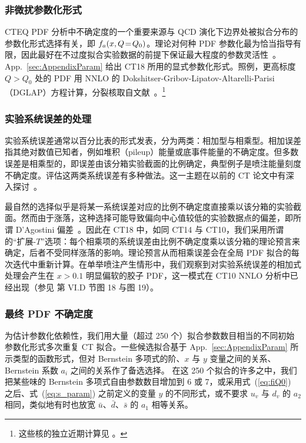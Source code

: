 \subsubsection{非微扰参数化形式\label{sec:ParamForms}}
CTEQ PDF 分析中不确定度的一个重要来源与 QCD 演化下边界处被拟合分布的参数化形式选择有关，即 $f_a(x,Q\! =\! Q_0)$。理论对何种 PDF 参数化最为恰当指导有限，因此最好在不过度拟合实验数据的前提下保证最大程度的参数灵活性~\cite{Kovarik:2019xvh}。App.~\ref{sec:AppendixParam} 给出 CT18 所用的显式参数化形式。照例，更高标度 $Q>Q_0$ 处的 PDF 用 NNLO 的 Dokshitser-Gribov-Lipatov-Altarelli-Parisi（DGLAP）方程计算，分裂核取自文献~\cite{Moch:2004pa,Vogt:2004mw}。\footnote{这些核的独立近期计算见 \cite{Ablinger:2014nga,Ablinger:2017tan}。}

\subsubsection{实验系统误差的处理\label{sec:SystErrors}} 实验系统误差通常以百分比表的形式发表，分为两类：相加型与相乘型。相加误差指其绝对数值已知者，例如堆积（pileup）能量或底事件能量的不确定度。但多数误差是相乘型的，即误差由该分箱实验截面的比例确定，典型例子是喷注能量刻度不确定度。评估这两类系统误差有多种做法。这一主题在以前的 CT 论文中有深入探讨~\cite{Stump:2003yu,Nadolsky:2008zw,Lai:2010vv,Ball:2012wy,Gao:2013xoa,Dulat:2015mca,Hou:2016nqm}。

最自然的选择似乎是将某一系统误差对应的比例不确定度直接乘以该分箱的实验截面。然而由于涨落，这种选择可能导致偏向中心值较低的实验数据点的偏差，即所谓 D'Agostini 偏差~\cite{DAgostini:1993arp,DAgostini:1999gfj}。因此在 CT18 中，如同 CT14 与 CT10，我们采用所谓的``扩展-$T$''选项：每个相乘项的系统误差由比例不确定度乘以该分箱的理论预言来确定，后者不受同样涨落的影响。理论预言从而相乘误差会在全局 PDF 拟合的每次迭代中重新计算。在单举喷注产生情形中，我们观察到对实验系统误差的相加式处理会产生在 $x>0.1$ 明显偏软的胶子 PDF，这一模式在 CT10 NNLO 分析中已经出现（参见 \cite{Gao:2013xoa} 第 VI.D 节图 18 与图 19）。


\subsubsection{最终 PDF 不确定度\label{sec:FinalPDFuncertainty}}
为估计参数化依赖性，我们用大量（超过 250 个）拟合参数数目相当的不同初始参数化形式多次重复 CT 拟合。一些候选拟合基于 App.~\ref{sec:AppendixParam} 所示类型的函数形式，但对 Bernstein 多项式的阶、$x$ 与 $y$ 变量之间的关系、Bernstein 系数 $a_i$ 之间的关系作了备选选择。
在这 250 个拟合的许多之中，我们把某些味的 Bernstein 多项式自由参数数目增加到 6 或 7，或采用式~(\ref{eq:fiQ0}) 之后、式~(\ref{eq:s_param}) 之前定义的变量 $y$ 的不同形式，或不要求 $u_v$ 与 $d_v$ 的 $a_2$ 相同，类似地有时也放宽 $\bar u$、$\bar d$、$\bar s$ 的 $a_1$ 相等关系。

